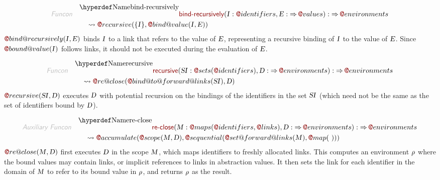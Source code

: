 \begin{align*}
  \KEY{Funcon} \quad
  & \FUNDEC{bind-recursively}(
                     \VAR{I} : \FUN@identifiers, \VAR{E} :  \TO \FUN@values) 
    :  \TO \FUN@environments \\&\quad
    \leadsto \FUN@recursive
               (  \{  \VAR{I} \}, 
                      \FUN@bind@value
                       (  \VAR{I}, 
                              \VAR{E} ) )
\end{align*}
$\FUN@bind@recursively
    (  \VAR{I}, 
           \VAR{E} )$ binds $\VAR{I}$ to a link that refers to the value of $\VAR{E}$, 
  representing a recursive binding of $\VAR{I}$ to the value of $\VAR{E}$.
  Since $\FUN@bound@value
    (  \VAR{I} )$ follows links, it should not be executed during the
  evaluation of $\VAR{E}$.

\begin{align*}
  \KEY{Funcon} \quad
  & \FUNDEC{recursive}(
                     \VAR{SI} : \FUN@sets
                               (  \FUN@identifiers ), \VAR{D} :  \TO \FUN@environments) 
    :  \TO \FUN@environments \\&\quad
    \leadsto \FUN@re@close
               (  \FUN@bind@to@forward@links
                       (  \VAR{SI} ), 
                      \VAR{D} )
\end{align*}
$\FUN@recursive
    (  \VAR{SI}, 
           \VAR{D} )$ executes $\VAR{D}$ with potential recursion on the bindings of 
  the identifiers in the set $\VAR{SI}$ (which need not be the same as the set of
  identifiers bound by $\VAR{D}$).

\begin{align*}
  \KEY{Auxiliary Funcon} \quad
  & \FUNDEC{re-close}(
                     \VAR{M} : \FUN@maps
                               (  \FUN@identifiers, 
                                      \FUN@links ), \VAR{D} :  \TO \FUN@environments) 
    :  \TO \FUN@environments \\&\quad
    \leadsto \FUN@accumulate
               (  \FUN@scope
                       (  \VAR{M}, 
                              \VAR{D} ), 
                      \FUN@sequential
                       (  \FUN@set@forward@links
                               (  \VAR{M} ), 
                              \FUN@map
                               (   \  ) ) )
\end{align*}
$\FUN@re@close
    (  \VAR{M}, 
           \VAR{D} )$ first executes $\VAR{D}$ in the scope $\VAR{M}$, which maps identifiers
  to freshly allocated links. This computes an environment $\VAR{\ensuremath{\rho}}$ where the bound
  values may contain links, or implicit references to links in abstraction
  values. It then sets the link for each identifier in the domain of $\VAR{M}$ to
  refer to its bound value in $\VAR{\ensuremath{\rho}}$, and returns $\VAR{\ensuremath{\rho}}$ as the result.

